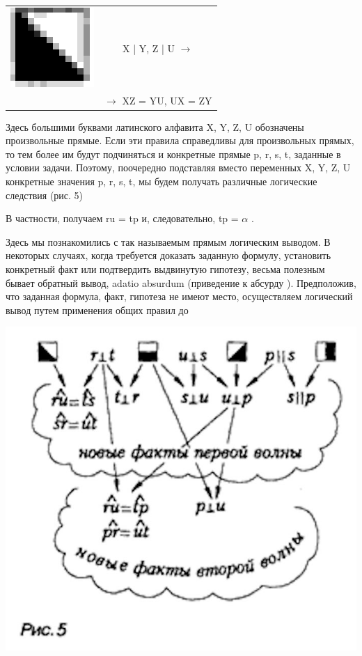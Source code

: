 \begin{minipage}{0.3\textwidth}
\begin{flushleft}
\begin{tabular}{c c}
\includegraphics[scale=0.16]{images/cube4.png}
& X | Y, Z | U $\rightarrow$\\
 
& $\rightarrow$ XZ = YU, UX = ZY \\[1ex] 



\end{tabular}
\end{flushleft}      
    
\hspace{0.1cm} Здесь большими буквами латинского
алфавита X, Y, Z, U обозначены произвольные прямые. Если эти правила справедливы для произвольных прямых, то тем более им будут подчиняться и конкретные прямые p, r, s, t, заданные в условии задачи. Поэтому, поочередно подставляя вместо переменных X, Y, Z, U конкретные значения p, r, s, t, мы будем
получать различные логические следствия (рис. 5) 

\hspace{0.1cm} В частности, получаем ru = tp и, следовательно, tp = $\alpha$ .

\hspace{0.1cm} Здесь мы познакомились с так называемым прямым логическим выводом. В некоторых случаях, когда требуется доказать заданную формулу, установить конкретный факт или подтвердить выдвинутую гипотезу, весьма полезным бывает обратный вывод, adatio absurdum (приведение к абсурду ). Предположив, что заданная формула, факт, гипотеза не имеют место, осуществляем логический
вывод путем применения общих правил до

\includegraphics[scale=0.205]{images/IMG_20221205_213857_118.jpg}


\end{minipage}
